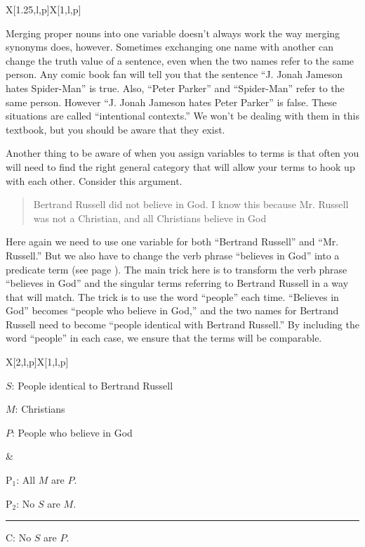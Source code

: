 {\begin{tabu}{{X[1.25,l,p]X[1,l,p]}}
\end{tabu}

Merging proper nouns into one variable doesn't always work the way merging synonyms does, however. Sometimes exchanging one name with another can change the truth value of a sentence, even when the two names refer to the same person. Any comic book fan will tell you that the sentence ``J. Jonah Jameson hates Spider-Man'' is true. Also, ``Peter Parker'' and ``Spider-Man'' refer to the same person. However ``J. Jonah Jameson hates Peter Parker'' is false. These situations are called ``intentional contexts.'' We won't be dealing with them in this textbook, but you should be aware that they exist. 

Another thing to be aware of when you assign variables to terms is that often you will need to find the right general category that will allow your terms to hook up with each other. \label{finding_general_terms} Consider this argument.

\begin{quotation}
Bertrand Russell did not believe in God. I know this because Mr. Russell was not a Christian, and all Christians believe in God
\end{quotation}

Here again we need to use one variable for both ``Bertrand Russell'' and ``Mr. Russell.'' But we also have to change the verb phrase ``believes in God'' into a predicate term (see page \pageref{subsec:nonstandard_verbs}). The main trick here is to transform the verb phrase ``believes in God'' and the singular terms referring to Bertrand Russell in a way that will match. The trick is to use the word ``people'' each time. ``Believes in God'' becomes ``people who believe in God,'' and the two names for Bertrand Russell need to become ``people identical with Bertrand Russell.'' By including the word ``people'' in each case, we ensure that the terms will be comparable. 
 
\begin{tabu}{{X[2,l,p]X[1,l,p]}}

\begin{ekey}
\item[$S$:] People identical to Bertrand Russell
\item[$M$:] Christians
\item[$P$:] People who believe in God
\end{ekey}

&

\begin{earg}
\item[P$_1$:] All $M$ are $P$.
\item[P$_2$:] No $S$ are $M$.
\vspace{-.5em}
\item [] \rule{0.5\linewidth}{.5pt} 
\item[C:] No $S$ are $P$.
\end{earg} 


\end{tabu}}

